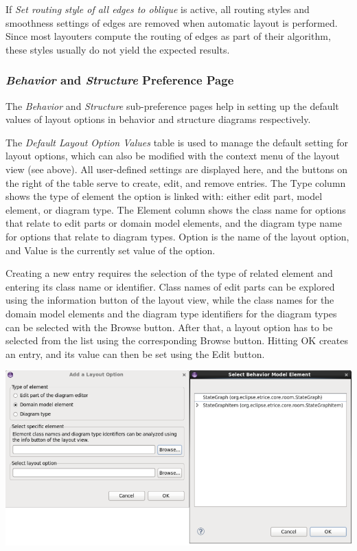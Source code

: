If \textit{Set routing style of all edges to oblique} is active, all routing styles and smoothness settings of edges are removed when automatic layout is performed. Since most layouters compute the routing of edges as part of their algorithm, these styles usually do not yield the expected results.

\subsubsection{\textit{Behavior} and \textit{Structure} Preference Page}

The \textit{Behavior} and \textit{Structure} sub-preference pages help in setting up the default values of layout options in behavior and structure diagrams respectively.

The \textit{Default Layout Option Values} table is used to manage the default setting for layout options, which can also be modified with the context menu of the layout view (see above). All user-defined settings are displayed here, and the buttons on the right of the table serve to create, edit, and remove entries. The Type column shows the type of element the option is linked with: either edit part, model element, or diagram type. The Element column shows the class name for options that relate to edit parts or domain model elements, and the diagram type name for options that relate to diagram types. Option is the name of the layout option, and Value is the currently set value of the option.

Creating a new entry requires the selection of the type of related element and entering its class name or identifier. Class names of edit parts can be explored using the information button of the layout view, while the class names for the domain model elements and the diagram type identifiers for the diagram types can be selected with the Browse button. After that, a layout option has to be selected from the list using the corresponding Browse button. Hitting OK creates an entry, and its value can then be set using the Edit button.

\includegraphics[width=\linewidth]{images/043-PreferencePage.png}

